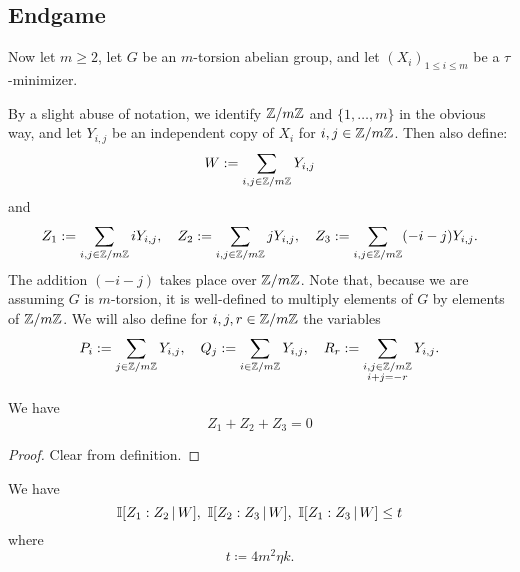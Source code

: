 \subsection{Endgame}

Now let $m \geq 2$, let $G$ be an $m$-torsion abelian group, and let $(X_i)_{1 \leq i \leq m}$ be a $\tau$-minimizer.

\begin{definition}\label{more-random}  By a slight abuse of notation, we identify $\mathbb{Z}/m\mathbb{Z}$ and $\{1,\dots,m\}$ in the obvious way, and let $Y_{i,j}$ be an independent copy of $X_i$ for $i,j \in \mathbb{Z}/m\mathbb{Z}$.  Then also define:
  \[
    W := \sum_{i,j \in \mathbb{Z}/m\mathbb{Z}} Y_{i,j}
  \]
  and
  \[
    Z_1 := \sum_{i,j \in \mathbb{Z}/m\mathbb{Z}} i Y_{i,j},\ \ \
    Z_2 := \sum_{i,j \in \mathbb{Z}/m\mathbb{Z}} j Y_{i,j},\ \ \
    Z_3 := \sum_{i,j \in \mathbb{Z}/m\mathbb{Z}} (-i-j) Y_{i,j}.
  \]
  The addition $(-i-j)$ takes place over $\mathbb{Z}/m\mathbb{Z}$.
  Note that, because we are assuming $G$ is $m$-torsion, it is well-defined to multiply elements of $G$ by elements of $\mathbb{Z}/m\mathbb{Z}$.
  We will also define for $i,j,r \in \mathbb{Z}/m\mathbb{Z}$ the variables
  \begin{equation}\label{pqr-defs}
    P_i := \sum_{j \in \mathbb{Z}/m\mathbb{Z}} Y_{i,j} , \quad
    Q_j := \sum_{i \in \mathbb{Z}/m\mathbb{Z}} Y_{i,j} , \quad
    R_r := \sum_{\substack{i,j \in \mathbb{Z}/m\mathbb{Z} \\ i+j=-r}} Y_{i,j} .\end{equation}
\end{definition}

\begin{lemma}\label{Zero-sum} We have
  \begin{equation}%
    \label{eq:sum-zero}
    Z_1+Z_2+Z_3= 0
  \end{equation}
\end{lemma}

\begin{proof}  Clear from definition.
\end{proof}

\begin{proposition}\label{prop:52}
  We have
  \[
    \mathbb{I}[Z_1 : Z_2\, |\, W],\
    \mathbb{I}[Z_2 : Z_3\, |\, W],\
    \mathbb{I}[Z_1 : Z_3\, |\, W] \leq t
  \]
  where
  \begin{equation}\label{t-def}
    t \coloneqq 4m^2 \eta k.
  \end{equation}
\end{proposition}

